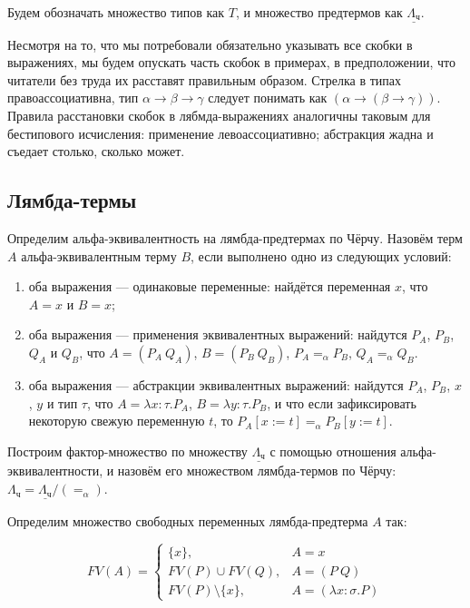\documentclass[10pt,a4paper,oneside]{article}
\begin{document}
Будем обозначать множество типов как $T$, и множество предтермов как $\underline{\Lambda_\texttt{ч}}$.

Несмотря на то, что мы потребовали обязательно указывать все скобки в выражениях, мы будем опускать
часть скобок в примерах, в предположении, что читатели без труда их расставят правильным образом.
Стрелка в типах правоассоциативна, тип $\alpha\rightarrow\beta\rightarrow\gamma$ следует
понимать как $(\alpha\rightarrow(\beta\rightarrow\gamma))$.
Правила расстановки скобок в лябмда-выражениях аналогичны таковым для бестипового исчисления: 
применение левоассоциативно; абстракция жадна и съедает столько, сколько может.

\subsection{Лямбда-термы}

Определим альфа-эквивалентность на лямбда-предтермах по Чёрчу.
Назовём терм $A$ альфа-эквивалентным терму $B$, если выполнено одно из следующих условий:

\begin{enumerate}
\item оба выражения --- одинаковые переменные: найдётся переменная $x$, что $A = x$ и $B = x$;
\item оба выражения --- применения эквивалентных выражений: найдутся $P_A$, $P_B$, $Q_A$ и $Q_B$, что
             $A = (P_A\ Q_A)$, $B = (P_B\ Q_B)$, $P_A =_\alpha P_B$, $Q_A =_\alpha Q_B$.
\item оба выражения --- абстракции эквивалентных выражений:
             найдутся $P_A$, $P_B$, $x$, $y$ и тип $\tau$, что $A = \lambda x: \tau.P_A$,
             $B = \lambda y: \tau.P_B$, и что если зафиксировать некоторую свежую переменную
             $t$, то $P_A[x := t] =_\alpha P_B[y := t]$.
\end{enumerate}

Построим фактор-множество по множеству $\underline{\Lambda_\texttt{ч}}$ с помощью отношения
альфа-эквивалентности, и назовём его множеством лямбда-термов по 
Чёрчу: $\Lambda_\texttt{ч} = \underline{\Lambda_\texttt{ч}}/(=_\alpha)$.

Определим множество свободных переменных лямбда-предтерма $A$ так:

$$FV(A) = \left\{ \begin{array}{ll} 
       \{x\}, & A = x \\
       FV(P)\cup FV(Q), & A = (P\ Q) \\
       FV(P)\setminus \{x\}, & A = (\lambda x:\sigma.P)            
\end{array}  \right.$$
\end{document}
